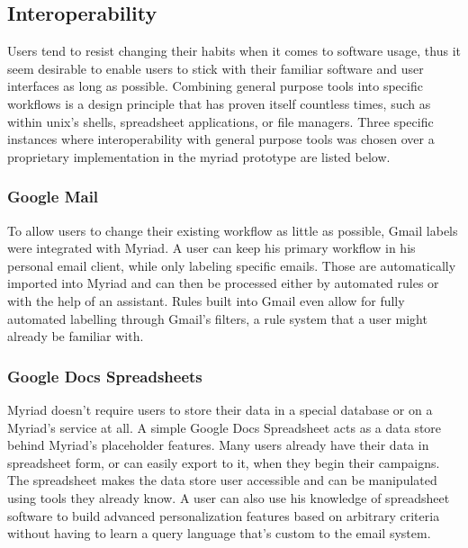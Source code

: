 
\subsection{Interoperability}

Users tend to resist changing their habits when it comes to software usage, thus it seem desirable to enable users to stick with their familiar software and user interfaces as long as possible. Combining general purpose tools into specific workflows is a design principle that has proven itself countless times, such as within unix’s shells, spreadsheet applications, or file managers.
Three specific instances where interoperability with general purpose tools was chosen over a proprietary implementation in the myriad prototype are listed below.
\subsubsection{Google Mail}
To allow users to change their existing workflow as little as possible, Gmail labels were integrated with Myriad. A user can keep his primary workflow in his personal email client, while only labeling specific emails. Those are automatically imported into Myriad and can then be processed either by automated rules or with the help of an assistant. Rules built into Gmail even allow for fully automated labelling through Gmail’s filters, a rule system that a user might already be familiar with.

\subsubsection{Google Docs Spreadsheets}

Myriad doesn't require users to store their data in a special database or on a Myriad's service at all. A simple Google Docs Spreadsheet acts as a data store behind Myriad's placeholder features. Many users already have their data in spreadsheet form, or can easily export to it, when they begin their campaigns. The spreadsheet makes the data store user accessible and can be manipulated using tools they already know. A user can also use his knowledge of spreadsheet software to build advanced personalization features based on arbitrary criteria without having to learn a query language that's custom to the email system.

